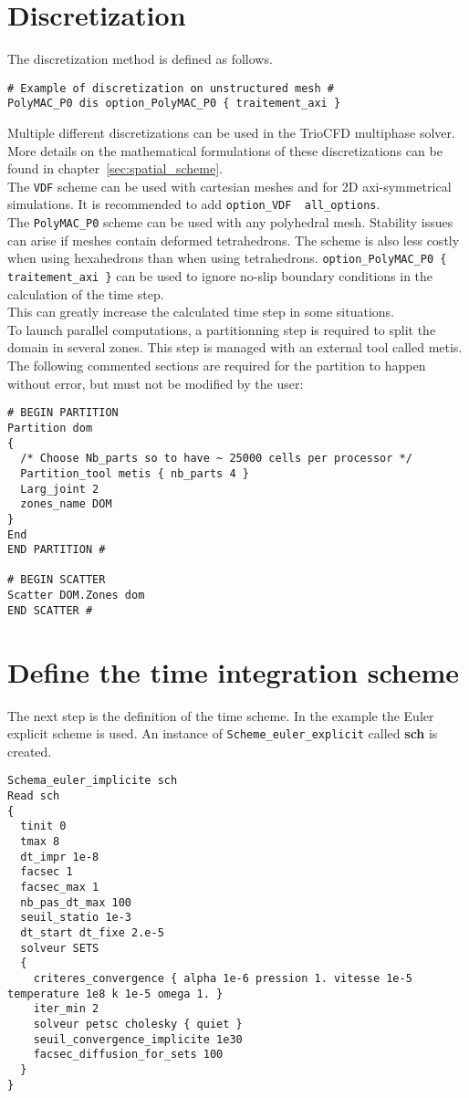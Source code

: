 \section{Discretization}\label{data:discretisation}
The discretization method is defined as follows.
\begin{lstlisting}
# Example of discretization on unstructured mesh #
PolyMAC_P0 dis option_PolyMAC_P0 { traitement_axi }
\end{lstlisting}
Multiple different discretizations can be used in the TrioCFD multiphase solver.
More details on the mathematical formulations of these discretizations can be found in chapter~\ref{sec:spatial_scheme}.\\
The \texttt{VDF} scheme can be used with cartesian meshes and for 2D axi-symmetrical simulations. 
It is recommended to add \texttt{option\_VDF { all_options}}.\\
The \texttt{PolyMAC\_P0} scheme can be used with any polyhedral mesh.
Stability issues can arise if meshes contain deformed tetrahedrons. The scheme is also less costly when using hexahedrons than when using tetrahedrons.
\texttt{option\_PolyMAC\_P0 \{ traitement\_axi \}} can be used to ignore no-slip boundary conditions in the calculation of the time step. \\
This can greatly increase the calculated time step in some situations.\\
To launch parallel computations, a partitionning step is required to split the domain in several zones. 
This step is managed with an external tool called metis.\\
The following commented sections are required for the partition to happen without error, but must not be modified by the user:
\begin{lstlisting}
# BEGIN PARTITION
Partition dom
{
  /* Choose Nb_parts so to have ~ 25000 cells per processor */
  Partition_tool metis { nb_parts 4 }
  Larg_joint 2
  zones_name DOM
}
End
END PARTITION #

# BEGIN SCATTER
Scatter DOM.Zones dom
END SCATTER #
\end{lstlisting}

\section{Define the time integration scheme}\label{data:time}
The next step is the definition of the time scheme. In the example the Euler explicit scheme is used. An instance of \texttt{Scheme\_euler\_explicit} called \textbf{sch} is created. 
\begin{lstlisting}
Schema_euler_implicite sch
Read sch
{
  tinit 0
  tmax 8
  dt_impr 1e-8
  facsec 1
  facsec_max 1
  nb_pas_dt_max 100
  seuil_statio 1e-3
  dt_start dt_fixe 2.e-5
  solveur SETS
  {
    criteres_convergence { alpha 1e-6 pression 1. vitesse 1e-5 temperature 1e8 k 1e-5 omega 1. }
    iter_min 2
    solveur petsc cholesky { quiet }
    seuil_convergence_implicite 1e30
    facsec_diffusion_for_sets 100
  }
}
\end{lstlisting}


